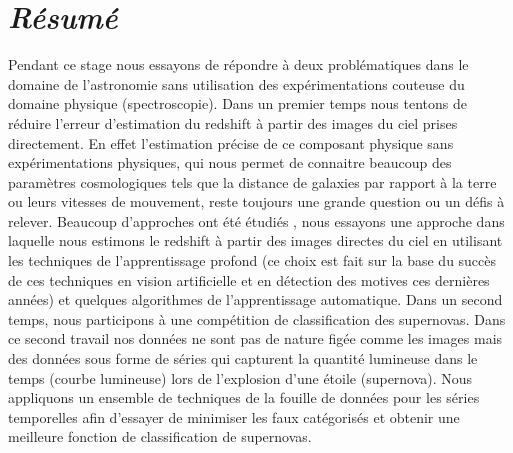\documentclass[french]{report}
\begin{document}
\newcommand{\HRule}{\rule{\linewidth}{0.5mm}}


    
 
        
        

\section*{\textit{Résumé}}
Pendant ce stage nous essayons de répondre à deux problématiques dans le domaine de l'astronomie sans utilisation des expérimentations couteuse du domaine physique (spectroscopie). Dans un premier temps nous tentons de réduire l'erreur d'estimation du redshift à partir des images du ciel prises directement. En effet l'estimation précise de ce composant physique sans expérimentations physiques, qui nous permet de connaitre beaucoup des paramètres cosmologiques tels que la distance de galaxies par rapport à la terre ou leurs vitesses de mouvement, reste toujours une grande question ou un défis à relever. Beaucoup d'approches ont été étudiés \cite{meuphirim, isanto, Narciso, adrian, photoSED}, nous essayons une approche dans laquelle nous estimons le redshift à partir des images directes du ciel en utilisant les techniques de l'apprentissage profond (ce choix est fait sur la base du succès de ces techniques en vision artificielle \cite{adavencedCNN} et en détection des motives \cite{rcnn} ces dernières années) et quelques algorithmes de l'apprentissage automatique. Dans un second temps, nous participons à une compétition de classification des supernovas. Dans ce second travail nos données ne sont pas de nature figée comme les images mais des données sous forme de séries qui capturent la quantité lumineuse dans le temps (courbe lumineuse) lors de l'explosion d'une étoile (supernova). Nous appliquons un ensemble de techniques de la fouille de données pour les séries temporelles afin d'essayer de minimiser les faux catégorisés et obtenir une meilleure fonction de classification de supernovas. 
\end{document}
